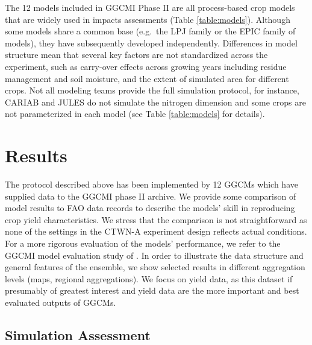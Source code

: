 \documentclass[gmd, manuscript]{copernicus} %
\begin{document}
The 12 models included in GGCMI Phase II are all process-based crop models that are widely used in impacts assessments (Table \ref{table:models}). 
Although some models share a common base (e.g.\ the LPJ family or the EPIC family of models), they have subsequently developed independently. 
Differences in model structure mean that several key factors are not standardized across the experiment, such as carry-over effects across growing years including residue management and soil moisture, and the extent of simulated area for different crops. 
Not all modeling teams provide the full simulation protocol, for instance, CARIAB and JULES do not simulate the nitrogen dimension and some crops are not parameterized in each model (see Table \ref{table:models} for details). 

\section{Results}

The protocol described above has been implemented by 12 GGCMs which have supplied data to the GGCMI phase II archive. 
We provide some comparison of model results to FAO data records to describe the models' skill in reproducing crop yield characteristics. 
We stress that the comparison is not straightforward as none of the settings in the CTWN-A experiment design reflects actual conditions. 
For a more rigorous evaluation of the models' performance, we refer to the GGCMI model evaluation study of \citet{muller_global_2017}. In order to illustrate the data structure and general features of the ensemble, we show selected results in different aggregation levels (maps, regional aggregations). 
We focus on yield data, as this dataset if presumably of greatest interest and yield data are the more important and best evaluated outputs of GGCMs.

\subsection{Simulation Assessment}
\label{S:3}
\end{document}
